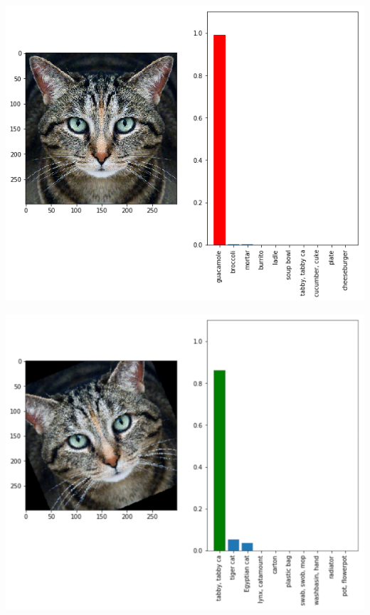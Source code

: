 \documentclass[aspectratio=169,usenames,dvipsnames]{beamer}
\begin{document}
\begin{frame}
\begin{center}
\includegraphics[height=0.95\textheight,keepaspectratio]{images/cat_adversarial.png} 
\end{center}
\end{frame}

\begin{frame}
\begin{center}
\includegraphics[height=0.95\textheight,keepaspectratio]{images/cat_rotated.png} 
\end{center}
\end{frame}
\end{document}
